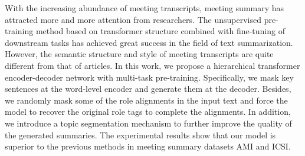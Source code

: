 With the increasing abundance of meeting transcripts, meeting summary has attracted more and more attention from researchers. The unsupervised pre-training method based on transformer structure combined with fine-tuning of downstream tasks has achieved great success in the field of text summarization. However, the semantic structure and style of meeting transcripts are quite different from that of articles. In this work, we propose a hierarchical transformer encoder-decoder network with multi-task pre-training. Specifically, we mask key sentences at the word-level encoder and generate them at the decoder. Besides, we randomly mask some of the role alignments in the input text and force the model to recover the original role tags to complete the alignments. In addition, we introduce a topic segmentation mechanism to further improve the quality of the generated summaries. The experimental results show that our model is superior to the previous methods in meeting summary datasets AMI and ICSI.
